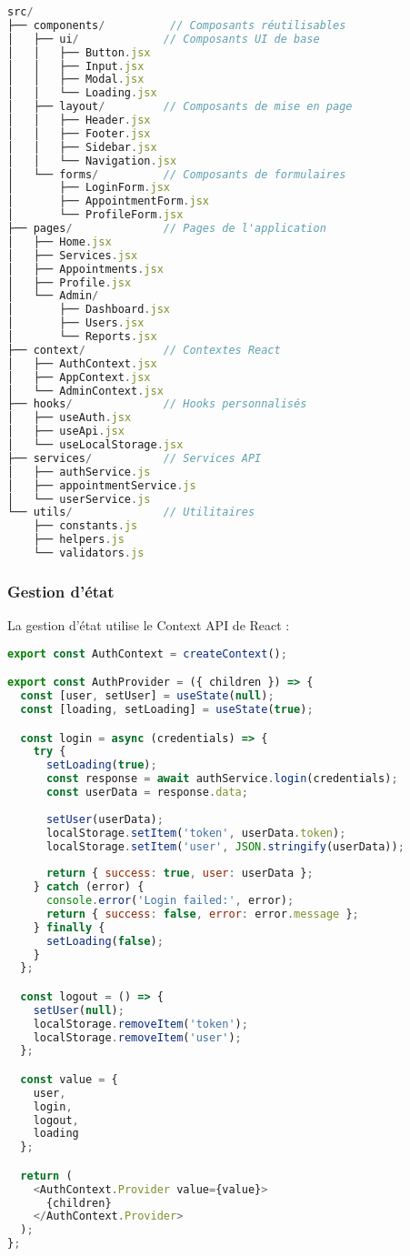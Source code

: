 \begin{lstlisting}[language=JavaScript, caption=Structure des composants React]
src/
├── components/          // Composants réutilisables
│   ├── ui/             // Composants UI de base
│   │   ├── Button.jsx
│   │   ├── Input.jsx
│   │   ├── Modal.jsx
│   │   └── Loading.jsx
│   ├── layout/         // Composants de mise en page
│   │   ├── Header.jsx
│   │   ├── Footer.jsx
│   │   ├── Sidebar.jsx
│   │   └── Navigation.jsx
│   └── forms/          // Composants de formulaires
│       ├── LoginForm.jsx
│       ├── AppointmentForm.jsx
│       └── ProfileForm.jsx
├── pages/              // Pages de l'application
│   ├── Home.jsx
│   ├── Services.jsx
│   ├── Appointments.jsx
│   ├── Profile.jsx
│   └── Admin/
│       ├── Dashboard.jsx
│       ├── Users.jsx
│       └── Reports.jsx
├── context/            // Contextes React
│   ├── AuthContext.jsx
│   ├── AppContext.jsx
│   └── AdminContext.jsx
├── hooks/              // Hooks personnalisés
│   ├── useAuth.jsx
│   ├── useApi.jsx
│   └── useLocalStorage.jsx
├── services/           // Services API
│   ├── authService.js
│   ├── appointmentService.js
│   └── userService.js
└── utils/              // Utilitaires
    ├── constants.js
    ├── helpers.js
    └── validators.js
\end{lstlisting}

\subsubsection{Gestion d'état}

La gestion d'état utilise le Context API de React :

\begin{lstlisting}[language=JavaScript, caption=Contexte d'authentification]
export const AuthContext = createContext();

export const AuthProvider = ({ children }) => {
  const [user, setUser] = useState(null);
  const [loading, setLoading] = useState(true);

  const login = async (credentials) => {
    try {
      setLoading(true);
      const response = await authService.login(credentials);
      const userData = response.data;
      
      setUser(userData);
      localStorage.setItem('token', userData.token);
      localStorage.setItem('user', JSON.stringify(userData));
      
      return { success: true, user: userData };
    } catch (error) {
      console.error('Login failed:', error);
      return { success: false, error: error.message };
    } finally {
      setLoading(false);
    }
  };

  const logout = () => {
    setUser(null);
    localStorage.removeItem('token');
    localStorage.removeItem('user');
  };

  const value = {
    user,
    login,
    logout,
    loading
  };

  return (
    <AuthContext.Provider value={value}>
      {children}
    </AuthContext.Provider>
  );
};
\end{lstlisting}

